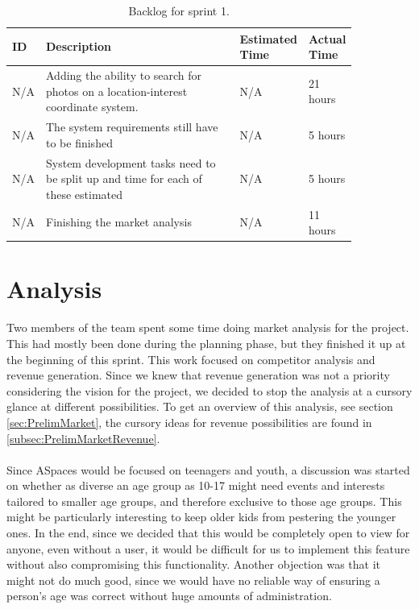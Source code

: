 \begin{landscape}
\setlength{\tabcolsep}{12pt}
\centering
\begin{table}[htbp]
\begin{tabular}{|p{0.05\linewidth}|p{0.60\linewidth}|p{0.1\linewidth}|p{0.1\linewidth}|}
\hline
\cellcolor{gray!25} ID & \cellcolor{gray!25} Description & \cellcolor{gray!25} Estimated Time & \cellcolor{gray!25} Actual Time \\
\hline
N/A & Adding the ability to search for photos on a location-interest coordinate system. & N/A & 21 hours \\
N/A & The system requirements still have to be finished & N/A & 5 hours \\
N/A & System development tasks need to be split up and time for each of these estimated & N/A & 5 hours \\
N/A & Finishing the market analysis & N/A & 11 hours \\
\hline
\end{tabular}
\caption{Backlog for sprint 1.} 
\label{tab:S1Backlog}
\end{table}
\end{landscape}

\section{Analysis}
\label{sec:S1Analysis}
Two members of the team spent some time doing market analysis for the project. This had mostly been done during the planning phase, but they finished it up at the beginning of this sprint. This work focused on competitor analysis and revenue generation. Since we knew that revenue generation was not a priority considering the vision for the project, we decided to stop the analysis at a cursory glance at different possibilities. To get an overview of this analysis, see section \ref{sec:PrelimMarket}, the cursory ideas for revenue possibilities are found in \ref{subsec:PrelimMarketRevenue}.

\paragraph{} Since ASpaces would be focused on teenagers and youth, a discussion was started on whether as diverse an age group as 10-17 might need events and interests tailored to smaller age groups, and therefore exclusive to those age groups. This might be particularly interesting to keep older kids from pestering the younger ones. In the end, since we decided that this would be completely open to view for anyone, even without a user, it would be difficult for us to implement this feature without also compromising this functionality. Another objection was that it might not do much good, since we would have no reliable way of ensuring a person's age was correct without huge amounts of administration.

